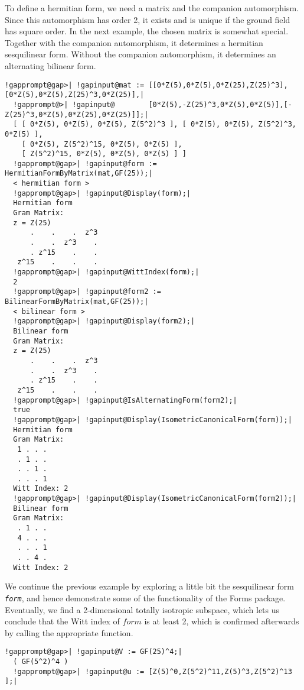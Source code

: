 \documentclass[a4paper,11pt]{report}
\begin{document}
{{{\begin{Verbatim}[commandchars=!@|,fontsize=\small,frame=single,label=Example]
\end{Verbatim}
 To define a hermitian form, we need a matrix and the companion automorphism.
Since this automorphism has order 2, it exists and is unique if the ground
field has square order. In the next example, the chosen matrix is somewhat
special. Together with the companion automorphism, it determines a hermitian
sesquilinear form. Without the companion automorphism, it determines an
alternating bilinear form. 
\begin{Verbatim}[commandchars=!@|,fontsize=\small,frame=single,label=Example]
  !gapprompt@gap>| !gapinput@mat := [[0*Z(5),0*Z(5),0*Z(25),Z(25)^3],[0*Z(5),0*Z(5),Z(25)^3,0*Z(25)],|
  !gapprompt@>| !gapinput@        [0*Z(5),-Z(25)^3,0*Z(5),0*Z(5)],[-Z(25)^3,0*Z(5),0*Z(25),0*Z(25)]];|
  [ [ 0*Z(5), 0*Z(5), 0*Z(5), Z(5^2)^3 ], [ 0*Z(5), 0*Z(5), Z(5^2)^3, 0*Z(5) ], 
    [ 0*Z(5), Z(5^2)^15, 0*Z(5), 0*Z(5) ], 
    [ Z(5^2)^15, 0*Z(5), 0*Z(5), 0*Z(5) ] ]
  !gapprompt@gap>| !gapinput@form := HermitianFormByMatrix(mat,GF(25));|
  < hermitian form >
  !gapprompt@gap>| !gapinput@Display(form);|
  Hermitian form
  Gram Matrix:
  z = Z(25)
      .    .    .  z^3
      .    .  z^3    .
      . z^15    .    .
   z^15    .    .    .
  !gapprompt@gap>| !gapinput@WittIndex(form);|
  2
  !gapprompt@gap>| !gapinput@form2 := BilinearFormByMatrix(mat,GF(25));|
  < bilinear form >
  !gapprompt@gap>| !gapinput@Display(form2);|
  Bilinear form
  Gram Matrix:
  z = Z(25)
      .    .    .  z^3
      .    .  z^3    .
      . z^15    .    .
   z^15    .    .    .
  !gapprompt@gap>| !gapinput@IsAlternatingForm(form2);|
  true
  !gapprompt@gap>| !gapinput@Display(IsometricCanonicalForm(form));|
  Hermitian form
  Gram Matrix:
   1 . . .
   . 1 . .
   . . 1 .
   . . . 1
  Witt Index: 2
  !gapprompt@gap>| !gapinput@Display(IsometricCanonicalForm(form2));|
  Bilinear form
  Gram Matrix:
   . 1 . .
   4 . . .
   . . . 1
   . . 4 .
  Witt Index: 2
\end{Verbatim}
 We continue the previous example by exploring a little bit the sesquilinear
form \mbox{\texttt{\mdseries\slshape form}}, and hence demonstrate some of the functionality of the \textsf{Forms} package. Eventually, we find a 2-dimensional totally isotropic subspace, which
lets us conclude that the Witt index of $form$ is at least 2, which is confirmed afterwards by calling the appropriate
function. 
\begin{Verbatim}[commandchars=!@|,fontsize=\small,frame=single,label=Example]
  !gapprompt@gap>| !gapinput@V := GF(25)^4;|
  ( GF(5^2)^4 )
  !gapprompt@gap>| !gapinput@u := [Z(5)^0,Z(5^2)^11,Z(5)^3,Z(5^2)^13 ];|

\end{Verbatim}}}}
\end{document}
